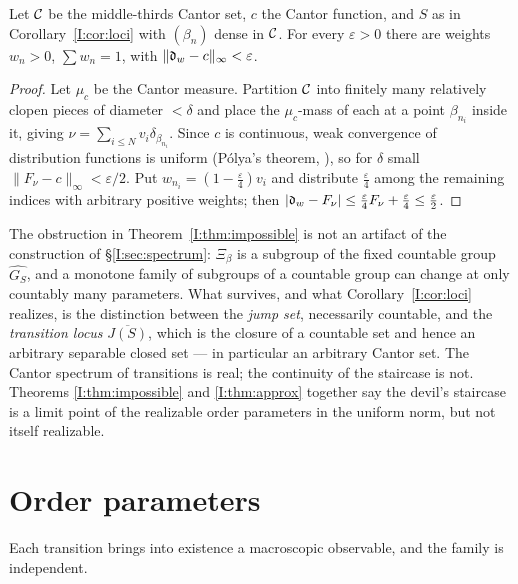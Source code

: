 \begin{theorem}[Approximation]\label{I:thm:approx}
Let $\mathcal{C}$ be the middle-thirds Cantor set, $c$ the Cantor function, and $S$ as in
Corollary~\ref{I:cor:loci} with $(\beta_n)$ dense in $\mathcal{C}$. For every $\varepsilon>0$ there
are weights $w_n>0$, $\sum w_n=1$, with $\|\mathfrak{d}_w-c\|_\infty<\varepsilon$.
\end{theorem}

\begin{proof}
Let $\mu_c$ be the Cantor measure. Partition $\mathcal{C}$ into finitely many relatively clopen
pieces of diameter $<\delta$ and place the $\mu_c$-mass of each at a point $\beta_{n_i}$
inside it, giving $\nu=\sum_{i\le N}v_i\delta_{\beta_{n_i}}$. Since $c$ is continuous, weak
convergence of distribution functions is uniform (P\'olya's theorem, \cite[Problem~14.8]{Billingsley}), so for $\delta$ small
$\|F_\nu-c\|_\infty<\varepsilon/2$. Put $w_{n_i}=(1-\tfrac\varepsilon4)v_i$ and distribute
$\tfrac\varepsilon4$ among the remaining indices with arbitrary positive weights; then
$|\mathfrak{d}_w-F_\nu|\le\tfrac\varepsilon4F_\nu+\tfrac\varepsilon4\le\tfrac\varepsilon2$.
\end{proof}

\begin{remark}\label{I:rem:whatremains}
The obstruction in Theorem~\ref{I:thm:impossible} is not an artifact of the construction of
\S\ref{I:sec:spectrum}: $\Xi_\beta$ is a subgroup of the fixed countable group
$\widehat{G_S}$, and a monotone family of subgroups of a countable group can change at only
countably many parameters. What survives, and what Corollary~\ref{I:cor:loci} realizes, is the
distinction between the \emph{jump set}, necessarily countable, and the \emph{transition
locus} $\overline{J(S)}$, which is the closure of a countable set and hence an arbitrary
separable closed set --- in particular an arbitrary Cantor set. The Cantor spectrum of
transitions is real; the continuity of the staircase is not. Theorems
\ref{I:thm:impossible} and \ref{I:thm:approx} together say the devil's staircase is a limit
point of the realizable order parameters in the uniform norm, but not itself realizable.
\end{remark}

\section{Order parameters}\label{I:sec:order}

Each transition brings into existence a macroscopic observable, and the family is
independent.

